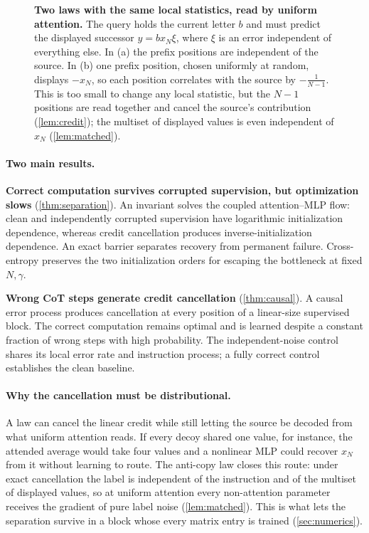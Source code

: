 \begin{figure}[t]
\centering
\resizebox{\linewidth}{!}{}
\caption{\textbf{Two laws with the same local statistics, read by uniform attention.} The query holds the current letter $b$ and
must predict the displayed successor $y=b x_N \xi$, where $\xi$ is an error independent of everything else. In (a) the prefix
positions are independent of the source. In (b) one prefix position, chosen uniformly at random, displays $-x_N$, so each position
correlates with the source by $-\tfrac{1}{N-1}$. This is too small to change any local statistic, but the $N-1$ positions are read
together and cancel the source's contribution (\cref{lem:credit}); the multiset of displayed values is even independent of $x_N$ (\cref{lem:matched}).}
\label{fig:cancel}
\end{figure}

\paragraph{Two main results.}
\textbf{Correct computation survives corrupted supervision, but optimization slows} (\cref{thm:separation}).
An invariant solves the coupled attention--MLP flow: clean and independently corrupted supervision have logarithmic initialization dependence,
whereas credit cancellation produces inverse-initialization dependence. An exact barrier separates recovery from permanent failure.
Cross-entropy preserves the two initialization orders for escaping the bottleneck at fixed $N,\gamma$.

\textbf{Wrong CoT steps generate credit cancellation} (\cref{thm:causal}).
A causal error process produces cancellation at every position of a linear-size supervised block.
The correct computation remains optimal and is learned despite a constant fraction of wrong steps with high probability.
The independent-noise control shares its local error rate and instruction process; a fully correct control establishes the clean baseline.

\paragraph{Why the cancellation must be distributional.}
A law can cancel the linear credit while still letting the source be decoded from what uniform attention reads.
If every decoy shared one value, for instance, the attended average would take four values and a nonlinear MLP could recover $x_N$ from it
without learning to route. The anti-copy law closes this route: under exact cancellation the label is independent of the instruction and of the
multiset of displayed values, so at uniform attention every non-attention parameter receives the gradient of pure label noise (\cref{lem:matched}).
This is what lets the separation survive in a block whose every matrix entry is trained (\cref{sec:numerics}).

